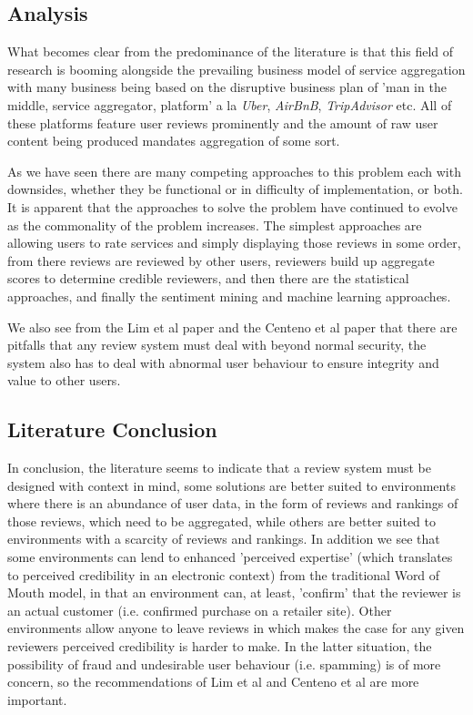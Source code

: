 \subsection{Analysis}
What becomes clear from the predominance of the literature is that this field of research is booming alongside the prevailing business model of service aggregation with many business being based on the disruptive business plan of 'man in the middle, service aggregator, platform' a la \emph{Uber}, \emph{AirBnB}, \emph{TripAdvisor} etc. All of these platforms feature user reviews prominently and the amount of raw user content being produced mandates aggregation of some sort. 

As we have seen there are many competing approaches to this problem each with downsides, whether they be functional or in difficulty of implementation, or both. It is apparent that the approaches to solve the problem have continued to evolve as the commonality of the problem increases. The simplest approaches are allowing users to rate services and simply displaying those reviews in some order, from there reviews are reviewed by other users, reviewers build up aggregate scores to determine credible reviewers, and then there are the statistical approaches, and finally the sentiment mining and machine learning approaches.

We also see from the Lim et al paper\cite{Lim} and the Centeno et al\cite{Centeno} paper that there are pitfalls that any review system must deal with beyond normal security, the system also has to deal with abnormal user behaviour to ensure integrity and value to other users.

\subsection{Literature Conclusion}
In conclusion, the literature seems to indicate that a review system must be designed with context in mind, some solutions are better suited to environments where there is an abundance of user data, in the form of reviews and rankings of those reviews, which need to be aggregated, while others are better suited to environments with a scarcity of reviews and rankings. In addition we see that some environments can lend to enhanced 'perceived expertise' (which translates to perceived credibility in an electronic context) from the traditional Word of Mouth model, in that an environment can, at least, 'confirm' that the reviewer is an actual customer (i.e. confirmed purchase on a retailer site). Other environments allow anyone to leave reviews in which makes the case for any given reviewers perceived credibility is harder to make. In the latter situation, the possibility of fraud and undesirable user behaviour (i.e. spamming) is of more concern, so the recommendations of \cite{Lim}Lim et al and \cite{Centeno}Centeno et al are more important.

